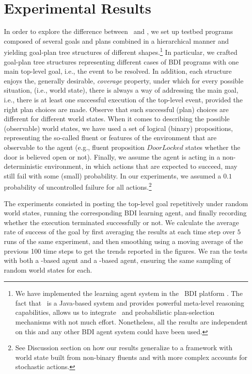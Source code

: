 \section{Experimental Results}\label{sec:experiments}

In order to explore the difference between \BUL\ and \CL, we set up testbed
programs composed of several goals and plans combined in a hierarchical manner
and yielding goal-plan tree structures of different shapes.\footnote{We have
implemented the learning agent system in the \JACK\ BDI platform
\cite{Busetta99jack}. The fact that \JACK\ is a Java-based system and
provides powerful meta-level reasoning capabilities, allows us to integrate \weka\ and
probabilistic plan-selection mechanisms with not much effort. Nonetheless, all
the results are independent on this and any other BDI agent system could
have been used.}
In particular, we crafted goal-plan tree structures representing different
cases of BDI programs with one main top-level goal, i.e., the event to
be resolved. In addition, each structure enjoys the, generally desirable,
\emph{coverage} property, under which for every possible situation, (i.e., world
state), there is always a way of addressing the main goal, i.e., there is at
least one successful execution of the top-level event, provided the right plan
choices are made. Observe that such successful (plan) choices are different
for different world states.
When it comes to describing the possible (observable) world states, we have used
a set of logical (binary) propositions, representing the so-called fluent or
features of the environment that are observable to the agent (e.g., fluent
proposition $\mathit{DoorLocked}$ states whether the door is believed open or
not).
Finally, we assume the agent is acting in a non-deterministic environment, in
which actions that are expected to succeed, may still fail with some (small)
probability. In our experiments, we assumed a $0.1$ probability of
uncontrolled failure for all actions.\footnote{See Discussion section on how our
results generalize to a framework with world state built from non-binary fluents
and with more complex accounts for stochastic actions.}




The experiments consisted in posting the top-level goal repetitively under random
world states, running the corresponding  BDI learning agent, and finally
recording whether the execution terminated successfully or not.
We calculate the average rate of success of the goal by first averaging the
results at each time step over $5$ runs of the same experiment, and then
smoothing using a moving average of the previous 100 time steps to get the trends
reported in the figures.
We ran the tests with both a \BUL-based agent and a \CL-based agent, ensuring the
same sampling of random world states for each.

